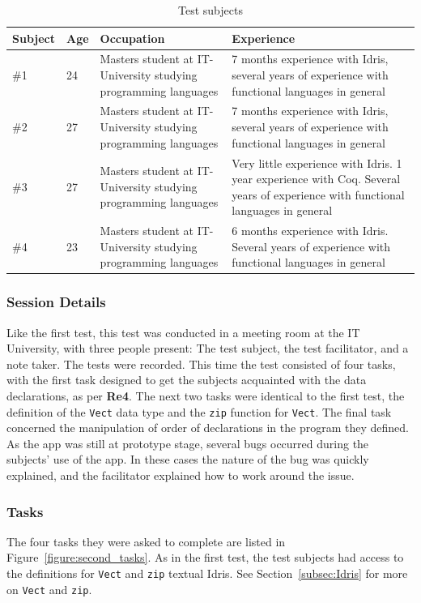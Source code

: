 \begin{table}[h]
\centering
\begin{tabular}{| l | l | p{5cm} | p{5cm} |}
\hline
Subject & Age & Occupation & Experience \\ \hline
\#1 & 24 & Masters student at IT-University studying programming languages & 7 months experience with Idris, several years of experience with functional languages in general \\ \hline
\#2 & 27 & Masters student at IT-University studying programming languages & 7 months experience with Idris, several years of experience with functional languages in general \\ \hline
\#3 & 27 & Masters student at IT-University studying programming languages & Very little experience with Idris. 1 year experience with Coq. Several years of experience with functional languages in general \\ \hline
\#4 & 23 & Masters student at IT-University studying programming languages & 6 months experience with Idris. Several years of experience with functional languages in general \\ \hline
\end{tabular}
\caption{Test subjects}
\label{table:second_test_subjects}
\end{table}

\subsubsection{Session Details}
Like the first test, this test was conducted in a meeting room at the IT
University, with three people present: The test subject, the test facilitator,
and a note taker. The tests were recorded. This time the test consisted of four
tasks, with the first task designed to get the subjects acquainted with the
data declarations, as per \textbf{Re4}. The next two tasks were identical to the first test, the
definition of the \texttt{Vect} data type and the \texttt{zip} function for
\texttt{Vect}. The final task concerned the manipulation of order of
declarations in the program they defined. As the app was still at prototype
stage, several bugs occurred during the subjects' use of the app. In these
cases the nature of the bug was quickly explained, and the facilitator
explained how to work around the issue.

\subsubsection{Tasks}
The four tasks they were asked to complete are listed in 
Figure~\ref{figure:second_tasks}.
As in the first test, the test subjects had access to the definitions for
\texttt{Vect} and \texttt{zip} textual Idris. See Section~\ref{subsec:Idris}
for more on \texttt{Vect} and \texttt{zip}.

